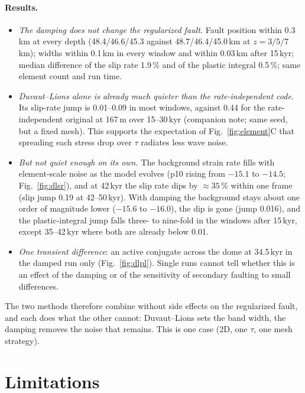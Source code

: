 \documentclass[11pt]{article}
\begin{document}
\paragraph{Results.}
\begin{itemize}
\item \emph{The damping does not change the regularized fault.} Fault position within 0.3\,km at
  every depth (48.4/46.6/45.3 against 48.7/46.4/45.0\,km at $z=3/5/7$\,km); widths within 0.1\,km
  in every window and within 0.03\,km after 15\,kyr; median difference of the slip rate 1.9\,\% and of
  the plastic integral 0.5\,\%; same element count and run time.
\item \emph{Duvaut--Lions alone is already much quieter than the rate-independent code.} Its
  slip-rate jump is 0.01--0.09 in most windows, against 0.44 for the rate-independent original at
  167\,m over 15--30\,kyr (companion note; same seed, but a fixed mesh). This supports the expectation
  of Fig.~\ref{fig:element}C that spreading each stress drop over $\tau$ radiates less wave noise.
\item \emph{But not quiet enough on its own.} The background strain rate fills with element-scale
  noise as the model evolves (p10 rising from $-15.1$ to $-14.5$; Fig.~\ref{fig:dlsr}), and at
  42\,kyr the slip rate dips by $\approx35$\,\% within one frame (slip jump 0.19 at 42--50\,kyr). With
  damping the background stays about one order of magnitude lower ($-15.6$ to $-16.0$), the dip is
  gone (jump 0.016), and the plastic-integral jump falls three- to nine-fold in the windows after
  15\,kyr, except 35--42\,kyr where both are already below 0.01.
\item \emph{One transient difference}: an active conjugate across the dome at 34.5\,kyr in the damped
  run only (Fig.~\ref{fig:dlpl}). Single runs cannot tell whether this is an effect of the damping or
  of the sensitivity of secondary faulting to small differences.
\end{itemize}
The two methods therefore combine without side effects on the regularized fault, and each does what
the other cannot: Duvaut--Lions sets the band width, the damping removes the noise that remains.
This is one case (2D, one $\tau$, one mesh strategy).

\section{Limitations}
\label{sec:lim}
\end{document}
